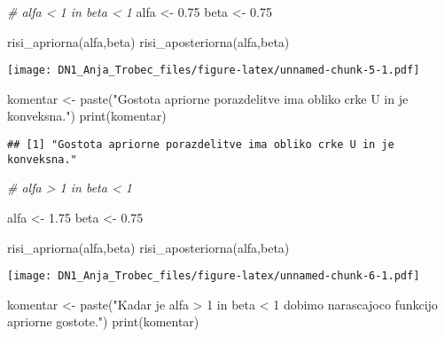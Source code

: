 \documentclass[
]{article}
\newenvironment{Shaded}{\begin{snugshade}}{\end{snugshade}}
\newcommand{\CommentTok}[1]{\textcolor[rgb]{0.56,0.35,0.01}{\textit{#1}}}
\newcommand{\FloatTok}[1]{\textcolor[rgb]{0.00,0.00,0.81}{#1}}
\newcommand{\FunctionTok}[1]{\textcolor[rgb]{0.00,0.00,0.00}{#1}}
\newcommand{\NormalTok}[1]{#1}
\newcommand{\OtherTok}[1]{\textcolor[rgb]{0.56,0.35,0.01}{#1}}
\newcommand{\StringTok}[1]{\textcolor[rgb]{0.31,0.60,0.02}{#1}}
\begin{document}
\begin{Shaded}
\begin{Highlighting}[]
\CommentTok{\# alfa \textless{} 1 in beta \textless{} 1}
\NormalTok{alfa }\OtherTok{\textless{}{-}} \FloatTok{0.75}
\NormalTok{beta }\OtherTok{\textless{}{-}} \FloatTok{0.75}


\FunctionTok{risi\_apriorna}\NormalTok{(alfa,beta)}
\FunctionTok{risi\_aposteriorna}\NormalTok{(alfa,beta)}
\end{Highlighting}
\end{Shaded}

\texttt{[image: DN1\_Anja\_Trobec\_files/figure-latex/unnamed-chunk-5-1.pdf]}

\begin{Shaded}
\begin{Highlighting}[]
\NormalTok{komentar }\OtherTok{\textless{}{-}} \FunctionTok{paste}\NormalTok{(}\StringTok{"Gostota apriorne porazdelitve ima obliko crke U in je konveksna."}\NormalTok{)}
\FunctionTok{print}\NormalTok{(komentar)}
\end{Highlighting}
\end{Shaded}

\begin{verbatim}
## [1] "Gostota apriorne porazdelitve ima obliko crke U in je konveksna."
\end{verbatim}

\begin{Shaded}
\begin{Highlighting}[]
\CommentTok{\# alfa \textgreater{} 1 in beta \textless{} 1}

\NormalTok{alfa }\OtherTok{\textless{}{-}} \FloatTok{1.75}
\NormalTok{beta }\OtherTok{\textless{}{-}} \FloatTok{0.75}


\FunctionTok{risi\_apriorna}\NormalTok{(alfa,beta)}
\FunctionTok{risi\_aposteriorna}\NormalTok{(alfa,beta)}
\end{Highlighting}
\end{Shaded}

\texttt{[image: DN1\_Anja\_Trobec\_files/figure-latex/unnamed-chunk-6-1.pdf]}

\begin{Shaded}
\begin{Highlighting}[]
\NormalTok{komentar }\OtherTok{\textless{}{-}} \FunctionTok{paste}\NormalTok{(}\StringTok{"Kadar je alfa \textgreater{} 1 in beta \textless{} 1 dobimo narascajoco funkcijo apriorne gostote."}\NormalTok{)}
\FunctionTok{print}\NormalTok{(komentar)}
\end{Highlighting}
\end{Shaded}
\end{document}
